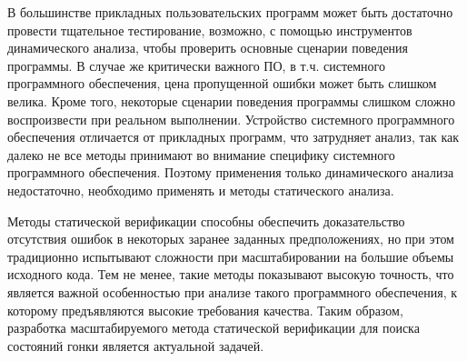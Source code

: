 В большинстве прикладных пользовательских программ может быть достаточно провести тщательное тестирование, возможно, с помощью инструментов динамического анализа, чтобы проверить основные сценарии поведения программы.
В случае же критически важного ПО, в т.ч. системного программного обеспечения, цена пропущенной ошибки может быть слишком велика.
Кроме того, некоторые сценарии поведения программы слишком сложно воспроизвести при реальном выполнении.
Устройство системного программного обеспечения отличается от прикладных программ, что затрудняет анализ, так как далеко не все методы принимают во внимание специфику системного программного обеспечения.
Поэтому применения только динамического анализа недостаточно, необходимо применять и методы статического анализа.

Методы статической верификации способны обеспечить доказательство отсутствия ошибок в некоторых заранее заданных предположениях, но при этом традиционно испытывают сложности при масштабировании на большие объемы исходного кода.
Тем не менее, такие методы показывают высокую точность, что является важной особенностью при анализе такого программного обеспечения, к которому предъявляются высокие требования качества.
Таким образом, разработка масштабируемого метода статической верификации для поиска состояний гонки является актуальной задачей.

